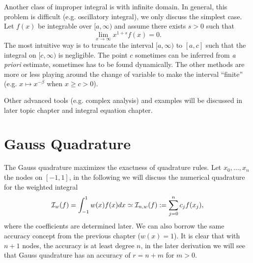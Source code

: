 Another class of improper integral is with infinite domain.  In general, this problem is difficult (e.g. oscillatory integral), we only discuss the simplest case. Let $f(x)$ be integrable over $[a, \infty)$ and assume there exists $s > 0$ such that 
\begin{equation}
    \lim_{x\to\infty} x^{1+s} f(x) = 0.
\end{equation}
The most intuitive way is to truncate the interval $[a, \infty)$ to $[a, c]$ such that the integral on $[c, \infty)$ is negligible. The point $c$ sometimes can be inferred from \emph{a priori} estimate, sometimes has to be found dynamically. The other methods are more or less playing around the change of variable to make the interval ``finite'' (e.g. $x\mapsto x^{-\beta}$ when $x\ge c > 0$). 

Other advanced tools (e.g. complex analysis) and examples will be discussed in later topic chapter and integral equation chapter.

\section{Gauss Quadrature}
The Gauss quadrature maximizes the exactness of quadrature rules. Let $x_0,\dots, x_n$ the nodes on $[-1,1]$, in the following we will discuss the numerical quadrature for the weighted integral 
$$\mathcal I_w(f) = \int_{-1}^1 w(x) f(x) dx\simeq \mathcal I_{n, w}(f):= \sum_{j=0}^n c_j f(x_j),$$
where the coefficients are determined later. We can also borrow the same accuracy concept from the previous chapter ($w(x) = 1$). It is clear that with $n+1$ nodes, the accuracy is at least degree $n$, in the later derivation we will see that Gauss quadrature has an accuracy of $r = n + m$ for $ m > 0$. 

